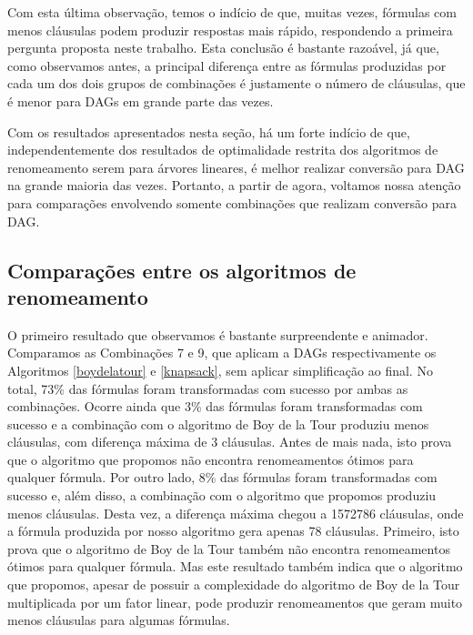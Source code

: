 Com esta última observação, temos o indício de que, muitas vezes, fórmulas com menos cláusulas podem produzir respostas mais rápido, respondendo a primeira pergunta proposta neste trabalho. Esta conclusão é bastante razoável, já que, como observamos antes, a principal diferença entre as fórmulas produzidas por cada um dos dois grupos de combinações é justamente o número de cláusulas, que é menor para DAGs em grande parte das vezes.

Com os resultados apresentados nesta seção, há um forte indício de que, independentemente dos resultados de optimalidade restrita dos algoritmos de renomeamento serem para árvores lineares, é melhor realizar conversão para DAG na grande maioria das vezes. Portanto, a partir de agora, voltamos nossa atenção para comparações envolvendo somente combinações que realizam conversão para DAG.


\subsection{Comparações entre os algoritmos de renomeamento}

\indent

O primeiro resultado que observamos é bastante surpreendente e animador. Comparamos as Combinações 7 e 9, que aplicam a DAGs respectivamente os Algoritmos \ref{boydelatour} e \ref{knapsack}, sem aplicar simplificação ao final. No total, 73\% das fórmulas foram transformadas com sucesso por ambas as combinações. Ocorre ainda que 3\% das fórmulas foram transformadas com sucesso e a combinação com o algoritmo de Boy de la Tour produziu menos cláusulas, com diferença máxima de 3 cláusulas. Antes de mais nada, isto prova que o algoritmo que propomos não encontra renomeamentos ótimos para qualquer fórmula. Por outro lado, 8\% das fórmulas foram transformadas com sucesso e, além disso, a combinação com o algoritmo que propomos produziu menos cláusulas. Desta vez, a diferença máxima chegou a 1572786 cláusulas, onde a fórmula produzida por nosso algoritmo gera apenas 78 cláusulas. Primeiro, isto prova que o algoritmo de Boy de la Tour também não encontra renomeamentos ótimos para qualquer fórmula. Mas este resultado também indica que o algoritmo que propomos, apesar de possuir a complexidade do algoritmo de Boy de la Tour multiplicada por um fator linear, pode produzir renomeamentos que geram muito menos cláusulas para algumas fórmulas.

